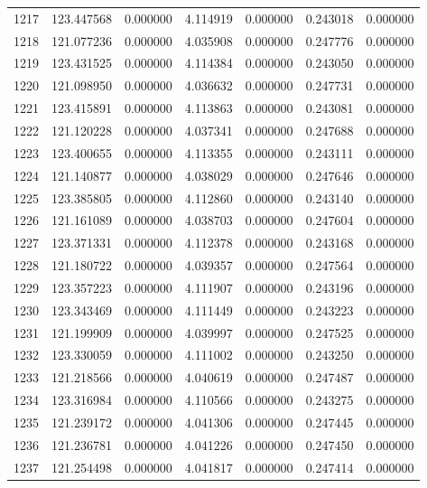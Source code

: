 \begin{tabular}{rrrrrrr}
1217 & 123.447568 &    0.000000 &  4.114919 &    0.000000 &    0.243018 &  0.000000 \\
1218 & 121.077236 &    0.000000 &  4.035908 &    0.000000 &    0.247776 &  0.000000 \\
1219 & 123.431525 &    0.000000 &  4.114384 &    0.000000 &    0.243050 &  0.000000 \\
1220 & 121.098950 &    0.000000 &  4.036632 &    0.000000 &    0.247731 &  0.000000 \\
1221 & 123.415891 &    0.000000 &  4.113863 &    0.000000 &    0.243081 &  0.000000 \\
1222 & 121.120228 &    0.000000 &  4.037341 &    0.000000 &    0.247688 &  0.000000 \\
1223 & 123.400655 &    0.000000 &  4.113355 &    0.000000 &    0.243111 &  0.000000 \\
1224 & 121.140877 &    0.000000 &  4.038029 &    0.000000 &    0.247646 &  0.000000 \\
1225 & 123.385805 &    0.000000 &  4.112860 &    0.000000 &    0.243140 &  0.000000 \\
1226 & 121.161089 &    0.000000 &  4.038703 &    0.000000 &    0.247604 &  0.000000 \\
1227 & 123.371331 &    0.000000 &  4.112378 &    0.000000 &    0.243168 &  0.000000 \\
1228 & 121.180722 &    0.000000 &  4.039357 &    0.000000 &    0.247564 &  0.000000 \\
1229 & 123.357223 &    0.000000 &  4.111907 &    0.000000 &    0.243196 &  0.000000 \\
1230 & 123.343469 &    0.000000 &  4.111449 &    0.000000 &    0.243223 &  0.000000 \\
1231 & 121.199909 &    0.000000 &  4.039997 &    0.000000 &    0.247525 &  0.000000 \\
1232 & 123.330059 &    0.000000 &  4.111002 &    0.000000 &    0.243250 &  0.000000 \\
1233 & 121.218566 &    0.000000 &  4.040619 &    0.000000 &    0.247487 &  0.000000 \\
1234 & 123.316984 &    0.000000 &  4.110566 &    0.000000 &    0.243275 &  0.000000 \\
1235 & 121.239172 &    0.000000 &  4.041306 &    0.000000 &    0.247445 &  0.000000 \\
1236 & 121.236781 &    0.000000 &  4.041226 &    0.000000 &    0.247450 &  0.000000 \\
1237 & 121.254498 &    0.000000 &  4.041817 &    0.000000 &    0.247414 &  0.000000 \\

\end{tabular}
